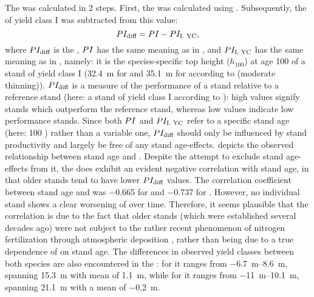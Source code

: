 The \ProductivityIndexVariableText{} was calculated in 2 steps.  First, the \ProductivityIndexText{} was calculated using .  Subsequently, the \ProductivityIndexText{} of yield class I was subtracted from this value:
\begin{equation}
  \label{eq:ProductivityIndexVariable}
  PI_{\text{diff}}{} = PI{} - PI_{\text{I. YC}}{},
\end{equation}
where \(PI_{\text{diff}}{}\) is the \ProductivityIndexVariableText{}, \(PI{}\) has the same meaning as in , and \(PI_{\text{I. YC}}{}\) has the same meaning as in , namely: it is the species-specific top height (\(h_{100}\)) at age \SI{100}{\year} of a stand of yield class I (\SI{32.4}{\meter} for \Beech{} and \SI{35.1}{\meter} for \Spruce{} according to \textcite{Schober1995} (moderate thinning)).  \(PI_{\text{diff}}{}\) is a measure of the performance of a stand relative to a reference stand (here: a stand of yield class I according to \textcite{Schober1995}): high values signify stands which outperform the reference stand, whereas low values indicate low performance stands.  Since both \(PI{}\) and \(PI_{\text{I. YC}}{}\) refer to a specific stand age (here: 100 \si{\year}) rather than a variable one, \(PI_{\text{diff}}{}\) should only be influenced by stand productivity and largely be free of any stand age-effects.   depicts the observed relationship between stand age and \ProductivityIndexVariableText{}.  Despite the attempt to exclude stand age-effects from it, the \ProductivityIndexVariableText{} does exhibit an evident negative correlation with stand age, in that older stands tend to have lower \(PI_{\text{diff}}{}\) values. The correlation coefficient between stand age and \ProductivityIndexVariableText{} was \num{-0.665} for \Beech{} and \num{-0.737} for \Spruce{}.  However, no individual stand shows a clear worsening of \ProductivityIndexVariableText{} over time.  Therefore, it seems plausible that the correlation is due to the fact that older stands (which were established several decades ago) were not subject to the rather recent phenomenon of nitrogen fertilization through atmospheric deposition \parencite{Kenk1988}, rather than being due to a true dependence of \ProductivityIndexVariableText{} on stand age.  The differences in observed yield classes between both species are also encountered in the \ProductivityIndexVariableText{}:  for \Beech{} it ranges from \SIrange{-6.7}{8.6}{\meter}, spanning \SI{15.3}{\meter} with mean of \SI{1.1}{\meter}, while for \Spruce{} it ranges from \SIrange{-11}{10.1}{\meter}, spanning \SI{21.1}{\meter} with a mean of \SI{-0.2}{\meter}.

